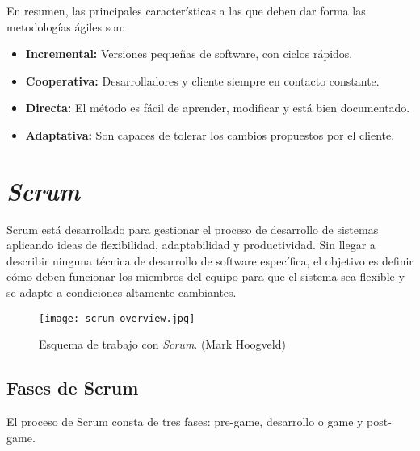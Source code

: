 En resumen, las principales características a las que deben dar forma las metodologías ágiles son:
\begin{itemize}
\item \textbf{Incremental:} Versiones pequeñas de software, con ciclos rápidos. 
\item \textbf{Cooperativa:} Desarrolladores y cliente siempre en contacto constante.
\item \textbf{Directa:} El método es fácil de aprender, modificar y está bien documentado.
\item \textbf{Adaptativa:} Son capaces de tolerar los cambios propuestos por el cliente.
\end{itemize}
\section{\textit{Scrum}}
Scrum está desarrollado para gestionar el proceso de desarrollo de sistemas aplicando ideas de flexibilidad, adaptabilidad y productividad. Sin llegar a describir ninguna técnica de desarrollo de software específica, el objetivo es definir cómo deben funcionar los miembros del equipo para que el sistema sea flexible y se adapte a condiciones altamente cambiantes.

\begin{figure}[t] 
  \centering
  \texttt{[image: scrum-overview.jpg]}
  \caption{Esquema de trabajo con \textit{Scrum}. (Mark Hoogveld)}
  \label{fig:scrum}
\end{figure}

\subsection{Fases de Scrum}
El proceso de Scrum consta de tres fases: pre-game, desarrollo o game y post-game.

